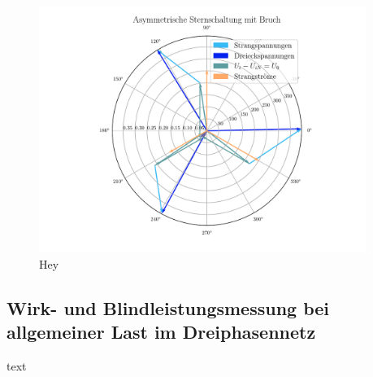 \documentclass[12pt,english,ngerman]{scrartcl}
\begin{document}
\begin{figure}[H]
	\begin{center}
		\includegraphics[width = 0.95\textwidth]{figures/zeigerSternAsymBruch.pdf}
	\end{center}
	\caption[Stromabhängige Leistungskurve einer Glühbirne]{ Hey
	}\label{fig:zeigerSternAsymBruch}
\end{figure}

\subsection{Wirk- und Blindleistungsmessung bei allgemeiner Last im Dreiphasennetz}

text
\end{document}
